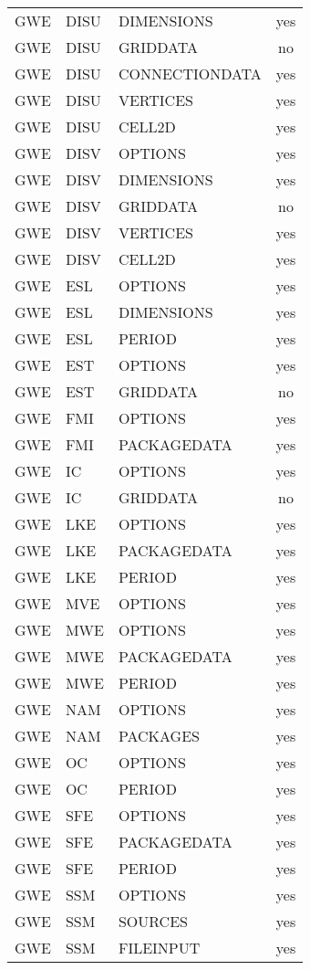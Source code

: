 \begin{longtable}{p{1.5cm} p{1.5cm} p{3cm} c}
GWE & DISU & DIMENSIONS & yes \\ 
GWE & DISU & GRIDDATA & no \\ 
GWE & DISU & CONNECTIONDATA & yes \\ 
GWE & DISU & VERTICES & yes \\ 
GWE & DISU & CELL2D & yes \\ 
\hline
GWE & DISV & OPTIONS & yes \\ 
GWE & DISV & DIMENSIONS & yes \\ 
GWE & DISV & GRIDDATA & no \\ 
GWE & DISV & VERTICES & yes \\ 
GWE & DISV & CELL2D & yes \\ 
\hline
GWE & ESL & OPTIONS & yes \\ 
GWE & ESL & DIMENSIONS & yes \\ 
GWE & ESL & PERIOD & yes \\ 
\hline
GWE & EST & OPTIONS & yes \\ 
GWE & EST & GRIDDATA & no \\ 
\hline
GWE & FMI & OPTIONS & yes \\ 
GWE & FMI & PACKAGEDATA & yes \\ 
\hline
GWE & IC & OPTIONS & yes \\ 
GWE & IC & GRIDDATA & no \\ 
\hline
GWE & LKE & OPTIONS & yes \\ 
GWE & LKE & PACKAGEDATA & yes \\ 
GWE & LKE & PERIOD & yes \\ 
\hline
GWE & MVE & OPTIONS & yes \\ 
\hline
GWE & MWE & OPTIONS & yes \\ 
GWE & MWE & PACKAGEDATA & yes \\ 
GWE & MWE & PERIOD & yes \\ 
\hline
GWE & NAM & OPTIONS & yes \\ 
GWE & NAM & PACKAGES & yes \\ 
\hline
GWE & OC & OPTIONS & yes \\ 
GWE & OC & PERIOD & yes \\ 
\hline
GWE & SFE & OPTIONS & yes \\ 
GWE & SFE & PACKAGEDATA & yes \\ 
GWE & SFE & PERIOD & yes \\ 
\hline
GWE & SSM & OPTIONS & yes \\ 
GWE & SSM & SOURCES & yes \\ 
GWE & SSM & FILEINPUT & yes \\ 

\end{longtable}

